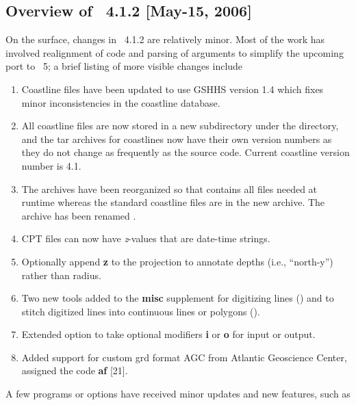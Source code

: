 \subsection{Overview of \gmt\ 4.1.2 [May-15, 2006]}

On the surface, changes in \GMT\ 4.1.2 are relatively minor.  Most of the work has involved
realignment of code and parsing of arguments to simplify the upcoming port to \GMT\ 5;
a brief listing of more visible changes include

\begin{enumerate}
\item Coastline files have been updated to use GSHHS version 1.4 which fixes minor inconsistencies
in the coastline database.
\item All coastline files are now stored in a new subdirectory  under the
 directory, and the tar archives for coastlines now have their own version numbers
as they do not change as frequently as the source code.  Current coastline version number is 4.1.
\item The archives have been reorganized so that  contains all files needed
at runtime whereas the standard coastline files are in the new  archive.
The  archive has been renamed .
\item CPT files can now have {\it z}-values that are date-time strings.
\item Optionally append {\bf z} to the  projection to annotate depths (i.e., ``north-y'') rather than radius.
\item Two new tools added to the {\bf misc} supplement for digitizing lines () and
to stitch digitized lines into continuous lines or polygons ().
\item Extended  option to take optional modifiers {\bf i} or {\bf o} for input or output.
\item Added support for custom grd format AGC from Atlantic Geoscience Center, assigned the code {\bf af} [21].
\end{enumerate}

A few programs or options have received minor updates and new features, such as

